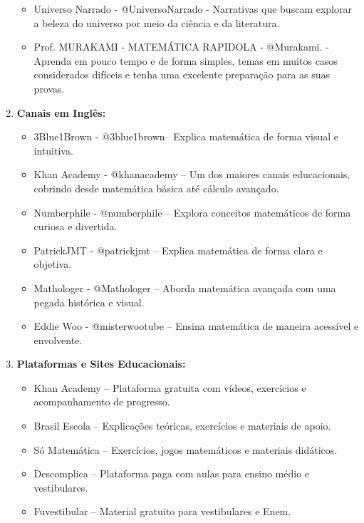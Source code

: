 \documentclass[a4paper,12pt]{article}
\begin{document}
\begin{enumerate}
\begin{itemize}
		\item Universo Narrado
		- @UniversoNarrado
		- Narrativas que buscam explorar a beleza do universo por meio da ciência e da literatura.
		
		\item Prof. MURAKAMI - MATEMÁTICA RAPIDOLA
		- @Murakami.
		- Aprenda em pouco tempo e de forma simples, temas em muitos casos considerados difíceis e tenha uma excelente preparação para as suas provas.
		
	\end{itemize}
	
	\item \textbf{Canais em Inglês:}
	
	\begin{itemize}
		\item 	3Blue1Brown - @3blue1brown– Explica matemática de forma visual e intuitiva.
		
		\item 	Khan Academy - @khanacademy – Um dos maiores canais educacionais, cobrindo desde matemática básica até cálculo avançado.
		
		\item 	Numberphile  - @numberphile – Explora conceitos matemáticos de forma curiosa e divertida.
		
		\item 	PatrickJMT - @patrickjmt – Explica matemática de forma clara e objetiva.
		
		\item 	Mathologer  - @Mathologer – Aborda matemática avançada com uma pegada histórica e visual.
		
		\item 	Eddie Woo - @misterwootube – Ensina matemática de maneira acessível e envolvente.
		
		
		
	\end{itemize}
	
	\item \textbf{Plataformas e Sites Educacionais:}
	\begin{itemize}
		\item 	Khan Academy – Plataforma gratuita com vídeos, exercícios e acompanhamento de progresso.
		
		\item	Brasil Escola – Explicações teóricas, exercícios e materiais de apoio.
		
		\item		Só Matemática – Exercícios, jogos matemáticos e materiais didáticos.
		
		\item 	Descomplica – Plataforma paga com aulas para ensino médio e vestibulares.
		
		\item		Fuvestibular – Material gratuito para vestibulares e Enem.
	\end{itemize}
	
	
	
	
\end{enumerate}
\end{document}

